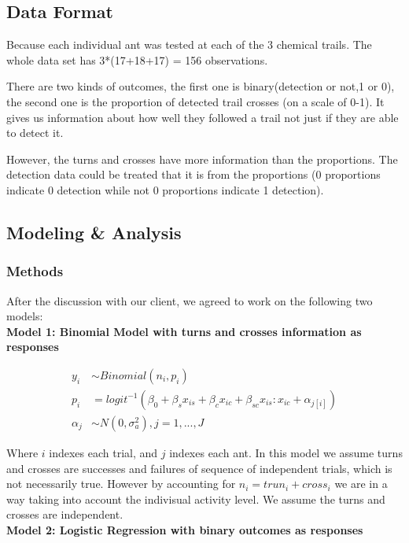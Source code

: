 \documentclass{article}
\begin{document}
	\subsection{Data Format}
	Because each individual ant was tested at each of the 3 chemical trails. The whole data set has 3*(17+18+17) = 156 observations. 
	
	There are two kinds of outcomes, the first one is binary(detection or not,1 or 0), the second one is the proportion of detected trail crosses (on a scale of 0-1). It gives us information about how well they followed a trail not just if they are able to detect it. 
	
	However, the turns and crosses have more information than the proportions. The detection data could be treated that it is from the proportions (0 proportions indicate 0 detection while not 0 proportions indicate 1 detection).
	
	

	\subsection{Modeling \& Analysis}
	\subsubsection{Methods}
	After the discussion with our client, we agreed to work on the following two models: \\
	
	\noindent\textbf{Model 1: Binomial Model with turns and crosses information as responses}  

	\begin{align*}
	y_i &\sim Binomial(n_i,p_i)\\
	p_i &= logit^{-1}(\beta_0 + \beta_sx_{is} + \beta_cx_{ic} + \beta_{sc}x_{is}:x_{ic} + \alpha_{j[i]})\\
	\alpha_j &\sim N(0, \sigma^2_a),j=1,...,J
	\end{align*}
	
	Where $i$ indexes each trial, and $j$ indexes each ant. In this model we assume turns and crosses are successes and failures of sequence of independent trials, which is not necessarily true. However by accounting for $n_i = trun_i + cross_i$ we are in a way taking into account the indivisual activity level. We assume the turns and crosses are independent.  \\
	
	\noindent\textbf{Model 2: Logistic Regression with binary outcomes as responses}  
	
\end{document}
